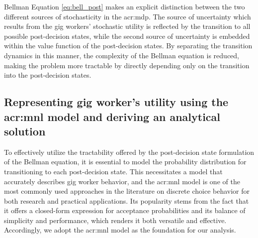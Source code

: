 Bellman Equation \ref{eq:bell_post} makes an explicit distinction between the two different sources of stochasticity in the \gls{acr:mdp}. The source of uncertainty which results from the gig workers' stochastic utility is reflected by the transition to all possible post-decision states, while the second source of uncertainty is embedded within the value function of the post-decision states. By separating the transition dynamics in this manner, the complexity of the Bellman equation is reduced, making the problem more tractable by directly depending only on the transition into the post-decision states.

\subsection{Representing gig worker's utility using the \gls{acr:mnl} model and deriving an analytical solution}
\label{sec:mnl}

To effectively utilize the tractability offered by the post-decision state formulation of the Bellman equation, it is essential to model the probability distribution for transitioning to each post-decision state. This necessitates a model that accurately describes gig worker behavior, and the \gls{acr:mnl} model is one of the most commonly used approaches in the literature on discrete choice behavior for both research and practical applications. Its popularity stems from the fact that it offers a closed-form expression for acceptance probabilities and its balance of simplicity and performance, which renders it both versatile and effective. Accordingly, we adopt the \gls{acr:mnl} model as the foundation for our analysis.

